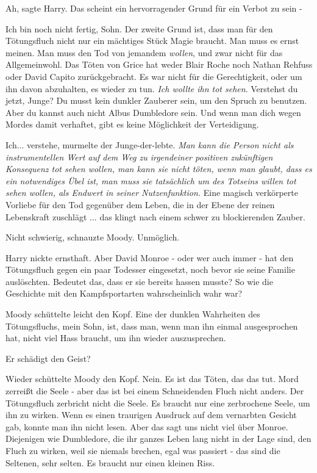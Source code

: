 \glqq Ah\grqq{}, sagte Harry. \glqq Das scheint ein hervorragender Grund für ein
Verbot zu sein -\grqq{}

\glqq Ich bin noch nicht fertig, Sohn. Der zweite Grund ist, dass man für den
Tötungsfluch nicht nur ein mächtiges Stück Magie braucht. Man muss es ernst
meinen. Man muss den Tod von jemandem \emph{wollen}, und zwar nicht für das
Allgemeinwohl. Das Töten von Grice hat weder Blair Roche noch Nathan Rehfuss
oder David Capito zurückgebracht. Es war nicht für die Gerechtigkeit, oder um
ihn davon abzuhalten, es wieder zu tun. \emph{Ich wollte ihn tot sehen}.
Verstehst du jetzt, Junge? Du musst kein dunkler Zauberer sein, um den Spruch zu
benutzen. Aber du kannst auch nicht Albus Dumbledore sein. Und wenn man dich
wegen Mordes damit verhaftet, gibt es keine Möglichkeit der Verteidigung.\grqq{}

\glqq Ich... verstehe\grqq{}, murmelte der Junge-der-lebte.
\emph{Man kann die Person nicht als instrumentellen Wert auf dem Weg zu irgendeiner positiven zukünftigen Konsequenz tot sehen wollen, man kann sie nicht töten, wenn man glaubt, dass es ein notwendiges Übel ist, man muss sie tatsächlich um des Totseins willen tot sehen wollen, als Endwert in seiner Nutzenfunktion. }
\glqq Eine magisch verkörperte Vorliebe für den Tod gegenüber dem Leben, die in
der Ebene der reinen Lebenskraft zuschlägt ... das klingt nach einem schwer zu
blockierenden Zauber.\grqq{}

\glqq Nicht schwierig\grqq{}, schnauzte Moody. \glqq Unmöglich.\grqq{}

Harry nickte ernsthaft. \glqq Aber David Monroe - oder wer auch immer - hat den
Tötungsfluch gegen ein paar Todesser eingesetzt, noch bevor sie seine Familie
auslöschten. Bedeutet das, dass er sie bereits hassen musste? So wie die
Geschichte mit den Kampfsportarten wahrscheinlich wahr war?\grqq{}

Moody schüttelte leicht den Kopf. \glqq Eine der dunklen Wahrheiten des
Tötungsfluchs, mein Sohn, ist, dass man, wenn man ihn einmal ausgesprochen hat,
nicht viel Hass braucht, um ihn wieder auszusprechen.\grqq{}

\glqq Er schädigt den Geist?\grqq{}

Wieder schüttelte Moody den Kopf. \glqq Nein. Es ist das Töten, das das tut.
Mord zerreißt die Seele - aber das ist bei einem Schneidenden Fluch nicht
anders. Der Tötungsfluch zerbricht nicht die Seele. Es braucht nur eine
zerbrochene Seele, um ihn zu wirken.\grqq{} Wenn es einen traurigen Ausdruck auf
dem vernarbten Gesicht gab, konnte man ihn nicht lesen. \glqq Aber das sagt uns
nicht viel über Monroe. Diejenigen wie Dumbledore, die ihr ganzes Leben lang
nicht in der Lage sind, den Fluch zu wirken, weil sie niemals brechen, egal was
passiert - das sind die Seltenen, sehr selten. Es braucht nur einen kleinen
Riss.\grqq{}

